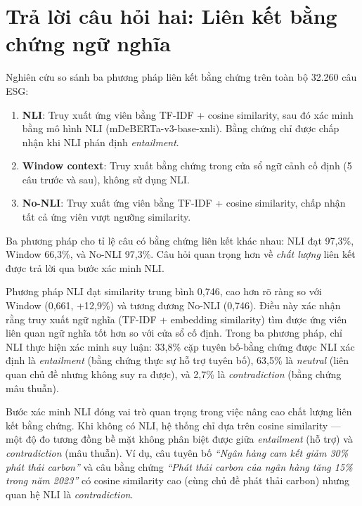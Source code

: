 \section{Trả lời câu hỏi hai: Liên kết bằng chứng ngữ nghĩa}
\label{sec:rq2}

Nghiên cứu so sánh ba phương pháp liên kết bằng chứng trên toàn bộ 32.260 câu ESG:

\begin{enumerate}
    \item \textbf{NLI}: Truy xuất ứng viên bằng TF-IDF + cosine similarity, sau đó xác minh bằng mô hình NLI (mDeBERTa-v3-base-xnli). Bằng chứng chỉ được chấp nhận khi NLI phán định \textit{entailment}.
    \item \textbf{Window context}: Truy xuất bằng chứng trong cửa sổ ngữ cảnh cố định (5 câu trước và sau), không sử dụng NLI.
    \item \textbf{No-NLI}: Truy xuất ứng viên bằng TF-IDF + cosine similarity, chấp nhận tất cả ứng viên vượt ngưỡng similarity.
\end{enumerate}

Ba phương pháp cho tỉ lệ câu có bằng chứng liên kết khác nhau: NLI đạt 97,3\%, Window 66,3\%, và No-NLI 97,3\%. Câu hỏi quan trọng hơn về \textit{chất lượng} liên kết được trả lời qua bước xác minh NLI.

Phương pháp NLI đạt similarity trung bình 0,746, cao hơn rõ ràng so với Window (0,661, +12,9\%) và tương đương No-NLI (0,746). Điều này xác nhận rằng truy xuất ngữ nghĩa (TF-IDF + embedding similarity) tìm được ứng viên liên quan ngữ nghĩa tốt hơn so với cửa sổ cố định. Trong ba phương pháp, chỉ NLI thực hiện xác minh suy luận: 33,8\% cặp tuyên bố-bằng chứng được NLI xác định là \textit{entailment} (bằng chứng thực sự hỗ trợ tuyên bố), 63,5\% là \textit{neutral} (liên quan chủ đề nhưng không suy ra được), và 2,7\% là \textit{contradiction} (bằng chứng mâu thuẫn).

Bước xác minh NLI đóng vai trò quan trọng trong việc nâng cao chất lượng liên kết bằng chứng. Khi không có NLI, hệ thống chỉ dựa trên cosine similarity --- một độ đo tương đồng bề mặt không phân biệt được giữa \textit{entailment} (hỗ trợ) và \textit{contradiction} (mâu thuẫn). Ví dụ, câu tuyên bố \textit{``Ngân hàng cam kết giảm 30\% phát thải carbon''} và câu bằng chứng \textit{``Phát thải carbon của ngân hàng tăng 15\% trong năm 2023''} có cosine similarity cao (cùng chủ đề phát thải carbon) nhưng quan hệ NLI là \textit{contradiction}.


